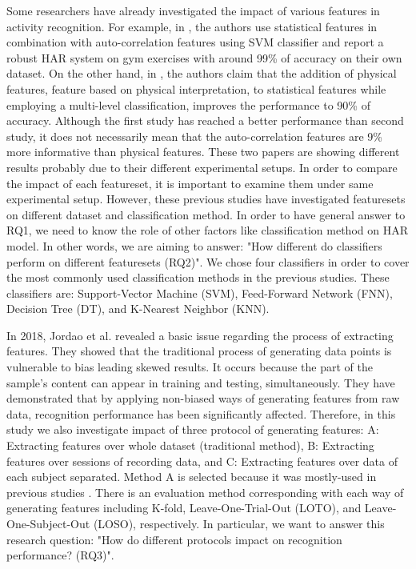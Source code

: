 \documentclass[journal,article,submit,moreauthors,pdftex]{Definitions/mdpi}
\begin{document}
Some researchers have already investigated the impact of various features in activity recognition\cite{morris2014recofit,zhang2013human, rosati2018comparison}. For example, in \cite{morris2014recofit}, the authors use statistical features in combination with auto-correlation features using SVM classifier and report a robust HAR system on gym exercises with around 99\% of accuracy on their own dataset. On the other hand, in \cite{zhang2011feature}, the authors claim that the addition of physical features, feature based on physical interpretation, to statistical features while employing a multi-level classification, improves the performance to 90\% of accuracy. Although the first study has reached a better performance than second study, it does not necessarily mean that the auto-correlation features are 9\% more informative than physical features. These two papers are showing different results probably due to their different experimental setups. In order to compare the impact of each featureset, it is important to examine them under same experimental setup. However, these previous studies have investigated featuresets on different dataset and classification method. In order to have general answer to RQ1, we need to know the role of other factors like classification method on HAR model. In other words, we are aiming to answer: "How different do classifiers perform on different featuresets (RQ2)". We chose four classifiers in order to cover the most commonly used classification methods in the previous studies. These classifiers are: Support-Vector Machine (SVM), Feed-Forward Network (FNN), Decision Tree (DT), and K-Nearest Neighbor (KNN).

In 2018, Jordao et al. \cite{jordao2018human} revealed a basic issue regarding the process of extracting features. They showed that the traditional process of generating data points is vulnerable to bias leading skewed results. It occurs because the part of the sample's content can appear in training and testing, simultaneously. They have demonstrated that by applying non-biased ways of generating features from raw data, recognition performance has been significantly affected. Therefore, in this study we also investigate impact of three protocol of generating features: A: Extracting features over whole dataset (traditional method), B: Extracting features over sessions of recording data, and C: Extracting features over data of each subject separated. Method A is selected because it was mostly-used in previous studies \cite{}. There is an evaluation method corresponding with each way of generating features including K-fold, Leave-One-Trial-Out (LOTO), and Leave-One-Subject-Out (LOSO), respectively. In particular, we want to answer this research question: "How do different protocols impact on recognition performance? (RQ3)".\\
\end{document}

